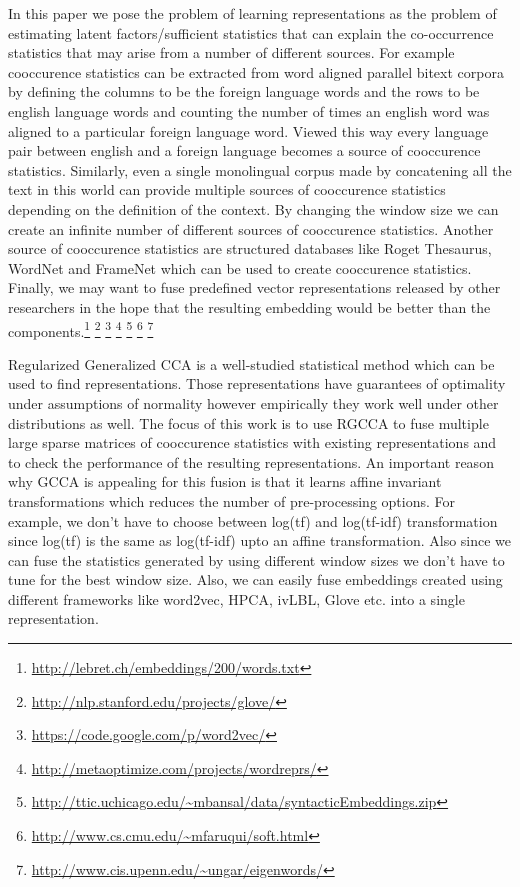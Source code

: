 \documentclass[11pt]{article}
\begin{document}
In this paper we pose the problem of learning representations as the
problem of estimating latent factors/sufficient statistics that can explain the
co-occurrence statistics that may arise from a number of different
sources. For example cooccurence statistics can be extracted from
word aligned parallel bitext corpora by defining the columns to be the
foreign language words and the rows to be english language words and
counting the number of times an english word was aligned to a
particular foreign language word. Viewed this way every language pair between english
and a foreign language becomes a source of cooccurence
statistics. Similarly, even a single monolingual corpus made by
concatening all the text in this world can provide multiple sources of
cooccurence statistics depending on the definition of the
context. By changing the window size we can create an infinite number
of different sources of cooccurence statistics. Another source of
cooccurence statistics are structured databases like Roget Thesaurus,
WordNet and FrameNet which can be used to create cooccurence
statistics. Finally, we may want to fuse predefined vector
representations released by other
researchers in the hope that the resulting embedding would be better
than the components.\footnote{\url{http://lebret.ch/embeddings/200/words.txt}}
  \footnote{\url{http://nlp.stanford.edu/projects/glove/}}
  \footnote{\url{https://code.google.com/p/word2vec/}}
  \footnote{\url{http://metaoptimize.com/projects/wordreprs/}}
  \footnote{\url{http://ttic.uchicago.edu/~mbansal/data/syntacticEmbeddings.zip}}
  \footnote{\url{http://www.cs.cmu.edu/~mfaruqui/soft.html}}
  \footnote{\url{http://www.cis.upenn.edu/~ungar/eigenwords/}}


Regularized Generalized CCA is a well-studied statistical method which
can be used to find representations. Those representations have
guarantees of optimality under assumptions of normality however
empirically they work well under other distributions as well. The
focus of this work is to use RGCCA to fuse multiple large sparse
matrices of cooccurence statistics with existing representations and to
check the performance of the resulting representations.
An important reason why GCCA is appealing for this fusion is that it
learns affine invariant transformations which reduces the number of
pre-processing options. For example, we don't have to choose 
between log(tf) and log(tf-idf) transformation since log(tf) is the
same as log(tf-idf) upto an affine transformation. Also since we can
fuse the statistics generated by 
using different window sizes we don't have to tune for the best window
size. Also, we can easily fuse embeddings created using
different frameworks like word2vec, HPCA, ivLBL, Glove etc. into a single representation.
\end{document}
